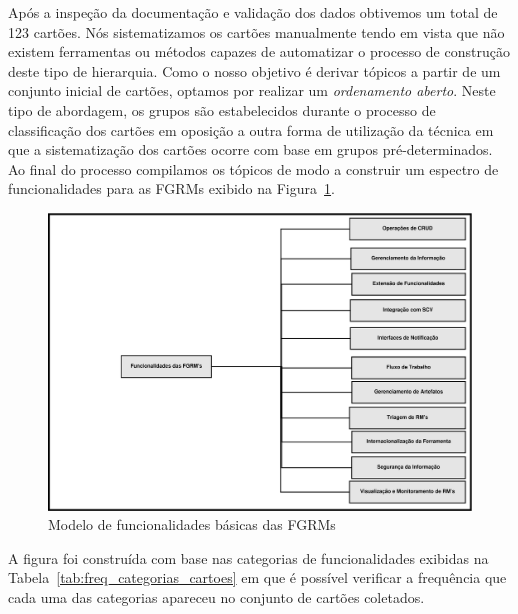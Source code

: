 Após a inspeção da documentação e validação dos dados obtivemos um total de 123
cartões. Nós sistematizamos os cartões manualmente tendo em vista que não
existem ferramentas ou métodos capazes de automatizar o processo de construção
deste tipo de hierarquia. Como o nosso objetivo é derivar tópicos a partir de um
conjunto inicial de cartões, optamos por realizar um \textit{ordenamento
    aberto}. Neste tipo de abordagem, os grupos são estabelecidos durante o
processo de classificação dos cartões em oposição a outra forma de utilização da
técnica em que a sistematização dos cartões ocorre com base em grupos
pré-determinados. Ao final do processo compilamos os tópicos de modo a construir
um espectro de funcionalidades para as FGRMs exibido na
Figura~\ref{fig:diagrama-espectro-funcionalidades-fgrm}.

\begin{figure}[htpb]
	\centering
	\includegraphics[width=1.15\linewidth]{./chapter-estudo-funcionalidades-fgrm/img/diagrama-espectro-funcionalidades-fgrm.pdf}
	\caption{Modelo de funcionalidades básicas das FGRMs}
\label{fig:diagrama-espectro-funcionalidades-fgrm}
\end{figure}

A figura foi construída com base nas categorias de funcionalidades exibidas na
Tabela~\ref{tab:freq_categorias_cartoes} em que é possível verificar a
frequência que cada uma das categorias apareceu no conjunto de cartões
coletados.

